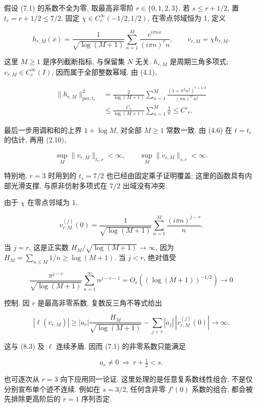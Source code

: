 \documentclass[UTF8,fontset=fandol,11pt,a4paper]{ctexart}
\begin{document}
假设 (7.1) 的系数不全为零, 取最高非零阶 \(r\in\{0,1,2,3\}\). 若 \(s\le r+1/2\), 置 \(t_r=r+1/2\le7/2\). 固定
\(\chi\in C_c^\infty(-1/2,1/2)\), 在零点邻域恒为 1, 定义


\[
 h_{r,M}(x)=\frac1{\sqrt{\log(M+1)}}
       \sum_{n=1}^M\frac{e^{i\pi nx}}{(i\pi n)^r n},
 \qquad
 v_{r,M}=\chi h_{r,M}.
 \tag{8.1}
\]


这里 \(M\ge1\) 是序列截断指标, 与保留集 \(N\) 无关.
\(h_{r,M}\) 是周期三角多项式; \(v_{r,M}\in C_c^\infty(I)\), 因而属于全部整数幂域.
由 (4.1),


\[
 \begin{split}
 \|h_{r,M}\|_{\mathrm{per},t_r}^2
 &=\frac2{\log(M+1)}
       \sum_{n=1}^M
       \frac{(1+\pi^2n^2)^{r+1/2}}{(\pi n)^{2r}n^2}\\
 &\le\frac{C_r}{\log(M+1)}\sum_{n=1}^M\frac1n
 \le C'_r.
 \end{split}
 \tag{8.2}
\]


最后一步用调和和的上界 \(1+\log M\), 对全部 \(M\ge1\) 常数一致.
由 (4.6) 在 \(t=t_r\) 的估计, 再用 (2.10),


\[
 \sup_M\|v_{r,M}\|_{t_r,c}<\infty,\qquad
 \sup_M\|v_{r,M}\|_{s,c}<\infty.
 \tag{8.3}
\]


特别地, \(r=3\) 时用到的 \(t_r=7/2\) 也已经由固定乘子证明覆盖; 这里的函数具有内部光滑支撑, 与原非仿射多项式在 \(7/2\) 出域没有冲突.


由于 \(\chi\) 在零点邻域为 1,


\[
 v_{r,M}^{(j)}(0)
 =\frac1{\sqrt{\log(M+1)}}\sum_{n=1}^M
           \frac{(i\pi n)^{j-r}}n.
 \tag{8.4}
\]


当 \(j=r\), 这是正实数
\(H_M/\sqrt{\log(M+1)}\to\infty\),
因为 \(H_M=\sum_{n\le M}1/n\ge\log(M+1)\).
当 \(j<r\), 绝对值受


\[
 \frac{\pi^{j-r}}{\sqrt{\log(M+1)}}
 \sum_{n=1}^\infty n^{j-r-1}
 =O_r((\log(M+1))^{-1/2})\to0
 \tag{8.5}
\]


控制. 因 \(r\) 是最高非零系数, 复数反三角不等式给出


\[
 |\ell(v_{r,M})|
 \ge |a_r|\frac{H_M}{\sqrt{\log(M+1)}}
       -\sum_{j<r}|a_j|\,|v_{r,M}^{(j)}(0)|
 \longrightarrow\infty.
 \tag{8.6}
\]


这与 (8.3) 及 \(\ell\) 连续矛盾. 因而 (7.1) 的非零系数只能满足


\[
 a_r\ne0\ \Longrightarrow\ r+\tfrac12<s.
 \tag{8.7}
\]


也可逐次从 \(r=3\) 向下应用同一论证. 这里处理的是任意复系数线性组合, 不是仅分别宣布单个迹不连续. 例如在 \(s=3/2\), 任何含非零 \(f'(0)\) 系数的组合, 都会被先排除更高阶后的 \(r=1\) 序列否定.
\end{document}
